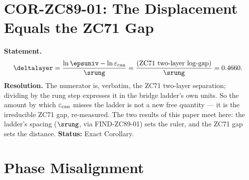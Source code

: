 \documentclass[12pt, a4paper]{article}
\renewcommand{\epscan}{\varepsilon_{\rm can}}   %
\begin{document}
\section{COR-ZC89-01: The Displacement Equals the ZC71 Gap}
\label{sec:cor-zc89}

\begin{formalbox}[title={COR-ZC89-01: $\deltalayer$ is the ZC71 gap in
  rung units ($R_0$, Exact)}]
\textbf{Statement.}
\begin{equation}
  \deltalayer
  = \frac{\ln\epsuniv-\ln\epscan}{\srung}
  = \frac{(\text{ZC71 two-layer log-gap})}{\srung}
  = 0.4660.
\end{equation}
\textbf{Resolution.} The numerator is, verbatim, the ZC71 two-layer
separation; dividing by the rung step expresses it in the bridge ladder's
own units. So the amount by which $\epscan$ misses the ladder is not a new
free quantity --- it is the irreducible ZC71 gap, re-measured. The two
results of this paper meet here: the ladder's spacing ($\srung$, via
FIND-ZC89-01) sets the ruler, and the ZC71 gap sets the distance.
\textbf{Status:} Exact Corollary.
\end{formalbox}

\section{Phase Misalignment}
\label{sec:pm-zc89}
\end{document}
